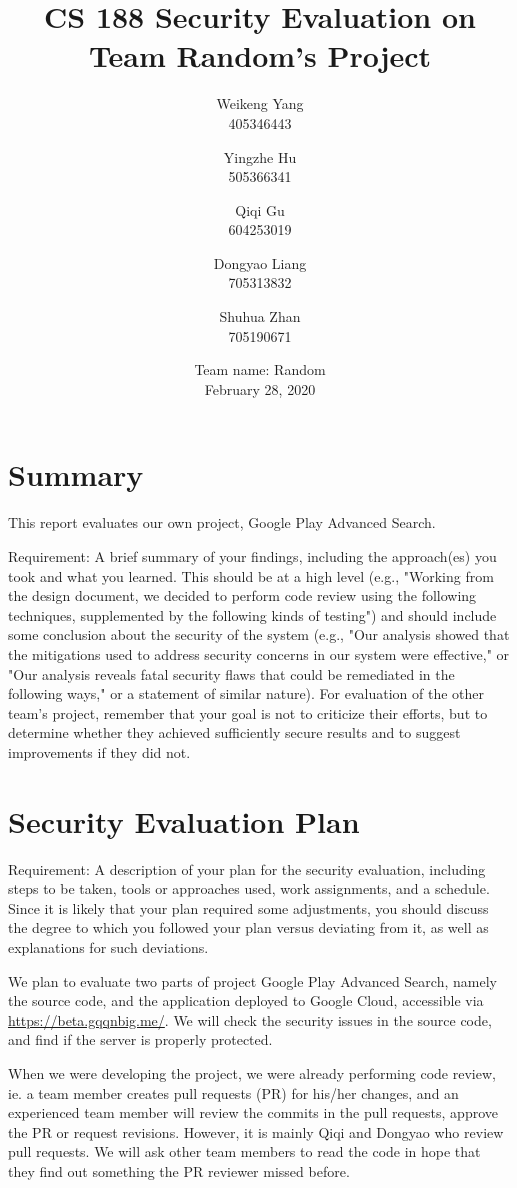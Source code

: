 \documentclass[12pt, a4paper]{article}
\title{CS 188 Security Evaluation on Team Random's Project}
\author{Weikeng Yang\\405346443 \and
Yingzhe Hu\\505366341 \and
Qiqi Gu\\604253019 \and
Dongyao Liang\\705313832 \and
Shuhua Zhan\\705190671}
\date{Team name: Random\\[2mm]February 28, 2020}
\begin{document}
\maketitle
\printindex

\section{Summary}

This report evaluates our own project, Google Play Advanced Search.

Requirement: A brief summary of your findings, including the approach(es) you took and what you learned. This should be at a high level (e.g., "Working from the design document, we decided to perform code review using the following techniques, supplemented by the following kinds of testing") and should include some conclusion about the security of the system (e.g., "Our analysis showed that the mitigations used to address security concerns in our system were effective," or "Our analysis reveals fatal security flaws that could be remediated in the following ways," or a statement of similar nature).   For evaluation of the other team’s project, remember that your goal is not to criticize their efforts, but to determine whether they achieved sufficiently secure results and to suggest improvements if they did not. 

\section{Security Evaluation Plan}

Requirement: A description of your plan for the security evaluation, including steps to be taken, tools or approaches used, work assignments, and a schedule. Since it is likely that your plan required some adjustments, you should discuss the degree to which you followed your plan versus deviating from it, as well as explanations for such deviations.  

We plan to evaluate two parts of project Google Play Advanced Search, namely the source code, and the application deployed to Google Cloud, accessible via \url{https://beta.gqqnbig.me/}. We will check the security issues in the source code, and find if the server is properly protected.

When we were developing the project, we were already performing code review, ie. a team member creates pull requests (PR) for his/her changes, and an experienced team member will review the commits in the pull requests, approve the PR or request revisions. However, it is mainly Qiqi and Dongyao who review pull requests. We will ask other team members to read the code in hope that they find out something the PR reviewer missed before.
\end{document}
